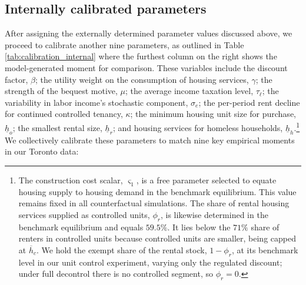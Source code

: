 \documentclass[parskip=full]{article}
\begin{document}
\subsection{Internally calibrated parameters}\label{sec:internal_calibration}

After assigning the externally determined parameter values discussed above, we proceed to calibrate another nine parameters, as outlined in Table \ref{tab:calibration_internal} where the furthest column on the right shows the model-generated moment for comparison. These variables include the discount factor, $\beta$; the utility weight on the consumption of housing services, $\gamma$; the strength of the bequest motive, $\mu$; the average income taxation level, $\tau_{\ell}$; the variability in labor income's stochastic component, $\sigma_{e}$; the per-period rent decline for continued controlled tenancy, $\kappa$; the minimum housing unit size for purchase, $\underline{h}_{o}$; the smallest rental size, $\underline{h}_{r}$; and housing services for homeless households, $\underline{h}_{h}$.\footnote{The construction cost scalar, $\varsigma_{1}$, is a free parameter selected to equate housing supply to housing demand in the benchmark equilibrium. This value remains fixed in all counterfactual simulations. The share of rental housing services supplied as controlled units, $\phi_r$, is likewise determined in the benchmark equilibrium and equals $59.5\%$. It lies below the $71\%$ share of renters in controlled units because controlled units are smaller, being capped at $\overline{h}_c$. We hold the exempt share of the rental stock, $1-\phi_r$, at its benchmark level in our unit control experiment, varying only the regulated discount; under full decontrol there is no controlled segment, so $\phi_r=0$.} We collectively calibrate these parameters to match nine key empirical moments in our Toronto data:
\end{document}
